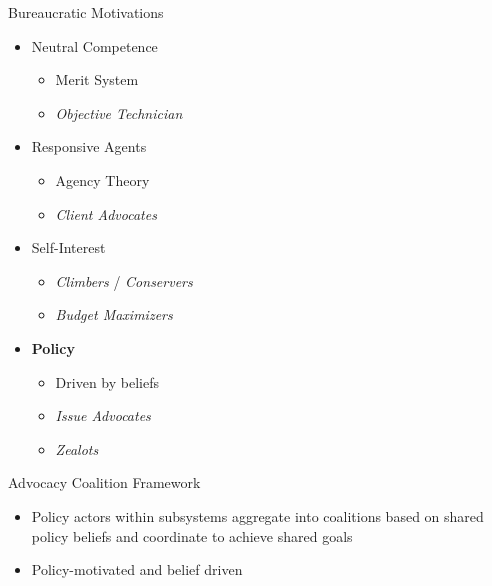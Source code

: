 \documentclass{beamer}
\begin{document}
\begin{frame}{Bureaucratic Motivations}

\begin{itemize}
\itemsep1pt\parskip0pt
\item
  Neutral Competence

  \begin{itemize}
  \itemsep1pt\parskip0pt
  \item
    Merit System
  \item
    \emph{Objective Technician}
  \end{itemize}
\item
  Responsive Agents

  \begin{itemize}
  \itemsep1pt\parskip0pt
  \item
    Agency Theory
  \item
    \emph{Client Advocates}
  \end{itemize}
\item
  Self-Interest

  \begin{itemize}
  \itemsep1pt\parskip0pt
  \item
    \emph{Climbers} / \emph{Conservers}
  \item
    \emph{Budget Maximizers}
  \end{itemize}
\item
  \textbf{Policy}

  \begin{itemize}
  \itemsep1pt\parskip0pt
  \item
    Driven by beliefs
  \item
    \emph{Issue Advocates}
  \item
    \emph{Zealots}
  \end{itemize}
\end{itemize}

\end{frame}

\begin{frame}{Advocacy Coalition Framework}

\begin{itemize}
\itemsep1pt\parskip0pt
\item
  Policy actors within subsystems aggregate into coalitions based on
  shared policy beliefs and coordinate to achieve shared goals
\end{itemize}

\vspace{0.25in}

\begin{itemize}
\itemsep1pt\parskip0pt
\item
  Policy-motivated and belief driven
\end{itemize}

\end{frame}
\end{document}
